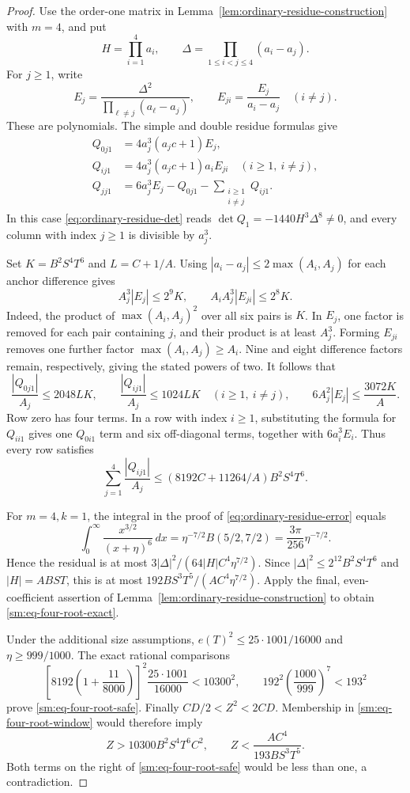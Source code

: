 \documentclass[12pt]{article}
\numberwithin{equation}{section}
\begin{document}
\begin{proof}
Use the order-one matrix in Lemma~\ref{lem:ordinary-residue-construction}
with \(m=4\), and put
\[
 H=\prod_{i=1}^4a_i,\qquad
 \Delta=\prod_{1\le i<j\le4}(a_i-a_j).
\]
For \(j\ge1\), write
\[
 E_j=\frac{\Delta^2}{\prod_{\ell\ne j}(a_\ell-a_j)},\qquad
 E_{ji}=\frac{E_j}{a_i-a_j}\quad(i\ne j).
\]
These are polynomials. The simple and double residue formulas give
\begin{align*}
 Q_{0j1}&=4a_j^3(a_jc+1)E_j,\\
 Q_{ij1}&=4a_j^3(a_jc+1)a_iE_{ji}\quad(i\ge1,\ i\ne j),\\
 Q_{jj1}&=6a_j^3E_j-Q_{0j1}-\sum_{\substack{i\ge1\\i\ne j}}Q_{ij1}.
\end{align*}
In this case \eqref{eq:ordinary-residue-det} reads
\(\det Q_1=-1440H^3\Delta^8\ne0\), and every column with index $j\ge1$
is divisible by \(a_j^3\).

Set \(K=B^2S^4T^6\) and \(L=C+1/A\). Using $|a_i-a_j|\le2\max(A_i,A_j)$ for each anchor difference gives
\[
 A_j^3|E_j|\le2^9K,\qquad
 A_iA_j^3|E_{ji}|\le2^8K.
\]
Indeed, the product of \(\max(A_i,A_j)^2\) over all six pairs is
\(K\). In \(E_j\), one factor is removed for each pair containing
\(j\), and their product is at least \(A_j^3\). Forming \(E_{ji}\)
removes one further factor \(\max(A_i,A_j)\ge A_i\). Nine and eight
difference factors remain, respectively, giving the stated powers of two.
It follows that
\[
 \frac{|Q_{0j1}|}{A_j}\le2048LK,\qquad
 \frac{|Q_{ij1}|}{A_j}\le1024LK\quad(i\ge1,\ i\ne j),
 \qquad 6A_j^2|E_j|\le\frac{3072K}{A}.
\]
Row zero has four terms. In a row with index $i\ge1$, substituting the formula for $Q_{ii1}$
gives one $Q_{0i1}$ term and six off-diagonal terms, together with
$6a_i^3E_i$. Thus every row satisfies
\[
 \sum_{j=1}^4\frac{|Q_{ij1}|}{A_j}
 \le(8192C+11264/A)B^2S^4T^6.
\]

For \(m=4,k=1\), the integral in the proof of
\eqref{eq:ordinary-residue-error} equals
\[
 \int_0^\infty\frac{x^{3/2}}{(x+\eta)^6}\,dx
 =\eta^{-7/2}B(5/2,7/2)
 =\frac{3\pi}{256}\eta^{-7/2}.
\]
Hence the residual is at most
\(3|\Delta|^2/(64|H|C^4\eta^{7/2})\).
Since \(|\Delta|^2\le2^{12}B^2S^4T^6\) and \(|H|=ABST\),
this is at most \(192BS^3T^5/(AC^4\eta^{7/2})\).
Apply the final, even-coefficient assertion of
Lemma~\ref{lem:ordinary-residue-construction} to obtain
\eqref{sm:eq-four-root-exact}.

Under the additional size assumptions,
\(e(T)^2\le25\cdot1001/16000\) and \(\eta\ge999/1000\).
The exact rational comparisons
\[
 \left[8192\left(1+\frac{11}{8000}\right)\right]^2
 \frac{25\cdot1001}{16000}<10300^2,
 \qquad
 192^2\left(\frac{1000}{999}\right)^7<193^2
\]
prove \eqref{sm:eq-four-root-safe}.
Finally \(CD/2<Z^2<2CD\). Membership in
\eqref{sm:eq-four-root-window} would therefore imply
\[
 Z>10300B^2S^4T^6C^2,\qquad
 Z<\frac{AC^4}{193BS^3T^5}.
\]
Both terms on the right of \eqref{sm:eq-four-root-safe} would be less
than one, a contradiction.
\end{proof}
\end{document}
